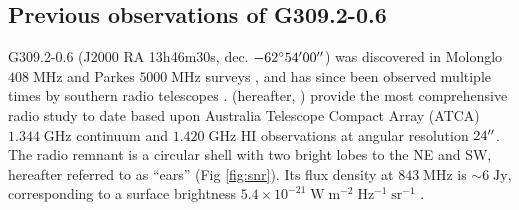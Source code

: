 \documentclass[preprint2,tighten,trackchanges]{aastex6}
\newcommand*{\mt}{\mathrm}
\newcommand*{\unit}[1]{\;\mt{#1}}  %
\newcommand*{\abt}{\mathord{\sim}} %
\begin{document}
%
%
%
%
%
%


\subsection{Previous observations of G309.2-0.6}

G309.2-0.6 (J2000 RA 13h46m30s, dec. $-62\mbox{$^\circ$} 54\mbox{$^\prime$} 00\mbox{$^{\prime\prime}$}$) was
discovered in Molonglo $408 \unit{MHz}$ and Parkes $5000 \unit{MHz}$ surveys
\citep{clark1973, green1974, clark1975}, and has since been observed multiple
times by southern radio telescopes \citep{caswell1981, kesteven1987,
whiteoak1996, gaensler1998}.
\citet{gaensler1998} (hereafter, ) provide the most
comprehensive radio study to date based upon Australia Telescope Compact Array
(ATCA) $1.344 \unit{GHz}$ continuum and $1.420 \unit{GHz}$ HI observations at
angular resolution $24\mbox{$^{\prime\prime}$}$.
The radio remnant is a circular shell with two bright lobes to the NE and SW,
hereafter referred to as ``ears'' (Fig \ref{fig:snr}).
Its flux density at $843 \unit{MHz}$ is $\abt 6 \unit{Jy}$, corresponding to a
surface brightness $5.4\times10^{-21} \unit{W \; m^{-2} \; Hz^{-1} \; sr^{-1}}$
\citep{whiteoak1996}.
\end{document}
